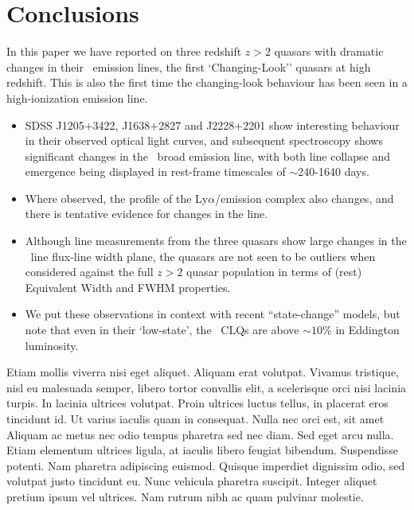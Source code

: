 \documentclass[a4paper,fleqn,usenatbib]{mnras}
\begin{document}
\section{Conclusions}
In this paper we have reported on three redshift $z>2$ quasars with
dramatic changes in their \civ\ emission lines, the first
`Changing-Look'' quasars at high redshift.  This is also the first
time the changing-look behaviour has been seen in a high-ionization
emission line.

\begin{itemize}
  \item SDSS J1205+3422, J1638+2827 and J2228+2201 show interesting behaviour
in their observed optical light curves, and subsequent spectroscopy
shows significant changes in the \civ\ broad emission line, with both
line collapse and emergence being displayed in rest-frame timescales
of $\sim$240-1640 days.
\item Where observed, the profile of the Ly$\alpha$/\nv emission complex
also changes, and there is tentative evidence for changes in the \mgii
line.
\item Although line measurements from the three quasars show large changes
in the \civ\ line flux-line width plane, the quasars are not seen to
be outliers when considered against the full $z>2$ quasar population
in terms of (rest) Equivalent Width and FWHM properties.
\item 
We put these observations in context with recent ``state-change''
models, but note that even in their `low-state', the \civ\ CLQs are
above $\sim10\%$ in Eddington luminosity.
\end{itemize}

Etiam mollis viverra nisi eget aliquet. Aliquam erat volutpat. Vivamus
tristique, nisl eu malesuada semper, libero tortor convallis elit, a
scelerisque orci nisi lacinia turpis. In lacinia ultrices
volutpat. Proin ultrices luctus tellus, in placerat eros tincidunt
id. Ut varius iaculis quam in consequat. Nulla nec orci est, sit amet
Aliquam ac metus nec odio tempus pharetra sed nec diam. Sed eget arcu
nulla. Etiam elementum ultrices ligula, at iaculis libero feugiat
bibendum. Suspendisse potenti. Nam pharetra adipiscing
euismod. Quisque imperdiet dignissim odio, sed volutpat justo
tincidunt eu. Nunc vehicula pharetra suscipit. Integer aliquet pretium
ipsum vel ultrices. Nam rutrum nibh ac quam pulvinar molestie.
\end{document}
